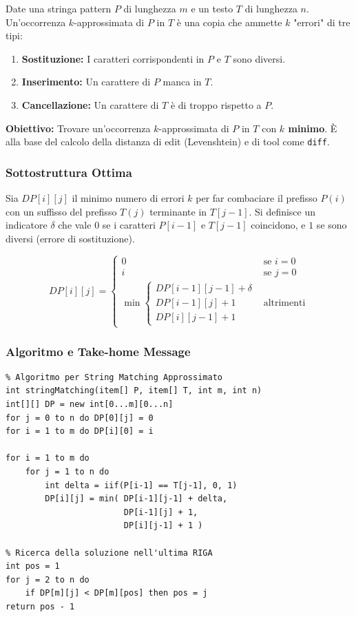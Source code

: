 \documentclass[12pt, a4paper]{article}
\begin{document}
\begin{tcolorbox}[colback=lightergray!10, colframe=tocsec, title=\textbf{Definizione del Problema}]
Date una stringa pattern $P$ di lunghezza $m$ e un testo $T$ di lunghezza $n$.
Un'occorrenza $k$-approssimata di $P$ in $T$ è una copia che ammette $k$ "errori" di tre tipi:
\begin{enumerate}
\item \textbf{Sostituzione:} I caratteri corrispondenti in $P$ e $T$ sono diversi.
\item \textbf{Inserimento:} Un carattere di $P$ manca in $T$.
\item \textbf{Cancellazione:} Un carattere di $T$ è di troppo rispetto a $P$.
\end{enumerate}
\textbf{Obiettivo:} Trovare un'occorrenza $k$-approssimata di $P$ in $T$ con \textbf{$k$ minimo}. È alla base del calcolo della distanza di edit (Levenshtein) e di tool come \texttt{diff}.
\end{tcolorbox}

\subsubsection{Sottostruttura Ottima}
Sia $DP[i][j]$ il minimo numero di errori $k$ per far combaciare il prefisso $P(i)$ con un suffisso del prefisso $T(j)$ terminante in $T[j-1]$.
Si definisce un indicatore $\delta$ che vale $0$ se i caratteri $P[i-1]$ e $T[j-1]$ coincidono, e $1$ se sono diversi (errore di sostituzione).


$$DP[i][j] = \begin{cases} 0 & \text{se } i = 0 \\ i & \text{se } j = 0 \\ \min \begin{cases} DP[i-1][j-1] + \delta \\ DP[i-1][j] + 1 \\ DP[i][j-1] + 1 \end{cases} & \text{altrimenti} \end{cases}$$

\subsubsection{Algoritmo e Take-home Message}
\begin{verbatim}
% Algoritmo per String Matching Approssimato
int stringMatching(item[] P, item[] T, int m, int n)
int[][] DP = new int[0...m][0...n]
for j = 0 to n do DP[0][j] = 0
for i = 1 to m do DP[i][0] = i

for i = 1 to m do
    for j = 1 to n do
        int delta = iif(P[i-1] == T[j-1], 0, 1)
        DP[i][j] = min( DP[i-1][j-1] + delta,
                        DP[i-1][j] + 1,
                        DP[i][j-1] + 1 )
                        
% Ricerca della soluzione nell'ultima RIGA
int pos = 1
for j = 2 to n do
    if DP[m][j] < DP[m][pos] then pos = j
return pos - 1

\end{verbatim}
\end{document}
